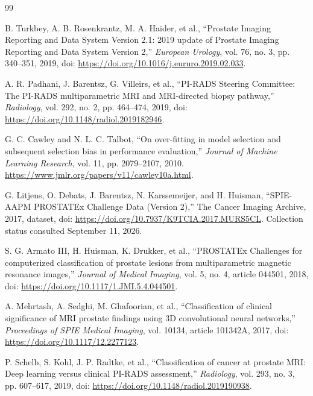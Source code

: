 \begin{thebibliography}{99}

 B. Turkbey, A. B. Rosenkrantz, M. A. Haider, et al., ``Prostate Imaging Reporting and Data System Version 2.1: 2019 update of Prostate Imaging Reporting and Data System Version 2,'' \emph{European Urology}, vol. 76, no. 3, pp. 340--351, 2019, doi: \url{https://doi.org/10.1016/j.eururo.2019.02.033}.

 A. R. Padhani, J. Barentsz, G. Villeirs, et al., ``PI-RADS Steering Committee: The PI-RADS multiparametric MRI and MRI-directed biopsy pathway,'' \emph{Radiology}, vol. 292, no. 2, pp. 464--474, 2019, doi: \url{https://doi.org/10.1148/radiol.2019182946}.

 G. C. Cawley and N. L. C. Talbot, ``On over-fitting in model selection and subsequent selection bias in performance evaluation,'' \emph{Journal of Machine Learning Research}, vol. 11, pp. 2079--2107, 2010. \url{https://www.jmlr.org/papers/v11/cawley10a.html}.

 G. Litjens, O. Debats, J. Barentsz, N. Karssemeijer, and H. Huisman, ``SPIE-AAPM PROSTATEx Challenge Data (Version 2),'' The Cancer Imaging Archive, 2017, dataset, doi: \url{https://doi.org/10.7937/K9TCIA.2017.MURS5CL}. Collection status consulted September 11, 2026.

 S. G. Armato III, H. Huisman, K. Drukker, et al., ``PROSTATEx Challenges for computerized classification of prostate lesions from multiparametric magnetic resonance images,'' \emph{Journal of Medical Imaging}, vol. 5, no. 4, article 044501, 2018, doi: \url{https://doi.org/10.1117/1.JMI.5.4.044501}.

 A. Mehrtash, A. Sedghi, M. Ghafoorian, et al., ``Classification of clinical significance of MRI prostate findings using 3D convolutional neural networks,'' \emph{Proceedings of SPIE Medical Imaging}, vol. 10134, article 101342A, 2017, doi: \url{https://doi.org/10.1117/12.2277123}.

 P. Schelb, S. Kohl, J. P. Radtke, et al., ``Classification of cancer at prostate MRI: Deep learning versus clinical PI-RADS assessment,'' \emph{Radiology}, vol. 293, no. 3, pp. 607--617, 2019, doi: \url{https://doi.org/10.1148/radiol.2019190938}.


\end{thebibliography}
